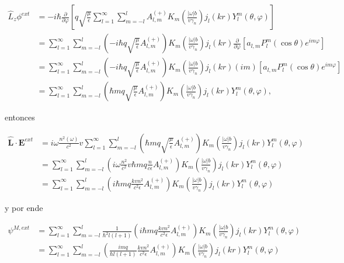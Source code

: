 \documentclass[a4paper,10pt]{article}
\newcommand{\hatbf}[1] {\hat{\mathbf{#1}}}	%
\begin{document}
\begin{subequations}
\begin{align}
\hat{L}_z\phi^{ext}	
&=-i\hbar\frac{\partial}{\partial\varphi} \left[ q\sqrt{\frac{\mu}{\epsilon}}\sum_{l=1}^{\infty}\sum_{m=-l}^l A_{l,m}^{(+)}K_m\left( \frac{|\omega|b}{v\gamma_n} \right) j_l(kr)Y_l^m(\theta,\varphi) \right]	\\
&=\sum_{l=1}^{\infty}\sum_{m=-l}^l \left(-i\hbar q\sqrt{\frac{\mu}{\epsilon}}A_{l,m}^{(+)}\right) K_m\left( \frac{|\omega|b}{v\gamma_n} \right) j_l(kr) \frac{\partial}{\partial \varphi} \left[ a_{l,m} P_l^m(\cos\theta)e^{im\varphi} \right]	\\
&=\sum_{l=1}^{\infty}\sum_{m=-l}^l \left(-i\hbar q\sqrt{\frac{\mu}{\epsilon}}A_{l,m}^{(+)}\right) K_m\left( \frac{|\omega|b}{v\gamma_n} \right) j_l(kr) (im) \left[ a_{l,m} P_l^m(\cos\theta)e^{im\varphi} \right]	\\
&=\sum_{l=1}^{\infty}\sum_{m=-l}^l \left(\hbar m q\sqrt{\frac{\mu}{\epsilon}}A_{l,m}^{(+)}\right) K_m\left( \frac{|\omega|b}{v\gamma_n} \right) j_l(kr) Y_l^m(\theta,\varphi),
\end{align}
\end{subequations}

entonces

\begin{subequations}
\begin{align}
\hatbf{L}\cdot\textbf{E}^{ext}
&=i\omega\frac{n^2(\omega)}{c^2}v\sum_{l=1}^{\infty}\sum_{m=-l}^l \left(\hbar m q\sqrt{\frac{\mu}{\epsilon}}A_{l,m}^{(+)}\right) K_m\left( \frac{|\omega|b}{v\gamma_n} \right) j_l(kr) Y_l^m(\theta,\varphi)	\\
&=\sum_{l=1}^{\infty}\sum_{m=-l}^l \left(i\omega\frac{n^2}{c^2}v\hbar m q\frac{n}{c\epsilon}A_{l,m}^{(+)}\right) K_m\left( \frac{|\omega|b}{v\gamma_n} \right) j_l(kr) Y_l^m(\theta,\varphi)	\\
&=\sum_{l=1}^{\infty}\sum_{m=-l}^l \left(i\hbar m q\frac{kvn^2}{c^2\epsilon}A_{l,m}^{(+)}\right) K_m\left( \frac{|\omega|b}{v\gamma_n} \right) j_l(kr) Y_l^m(\theta,\varphi)
\end{align}
\end{subequations}

y por ende

\begin{subequations}
\begin{align}
\psi^{M,ext}
&=\sum_{l=1}^{\infty}\sum_{m=-l}^l \frac{1}{\hbar^2l(l+1)}\left(i\hbar m q\frac{kvn^2}{c^2\epsilon}A_{l,m}^{(+)}\right) K_m\left( \frac{|\omega|b}{v\gamma_n} \right) j_l(kr) Y_l^m(\theta,\varphi)	\\
&=\sum_{l=1}^{\infty}\sum_{m=-l}^l \left(\frac{i m q}{\hbar l(l+1)}\frac{kvn^2}{c^2\epsilon}A_{l,m}^{(+)}\right) K_m\left( \frac{|\omega|b}{v\gamma_n} \right) j_l(kr) Y_l^m(\theta,\varphi)
\end{align}
\label{Eq3.15}
\end{subequations}
\end{document}
